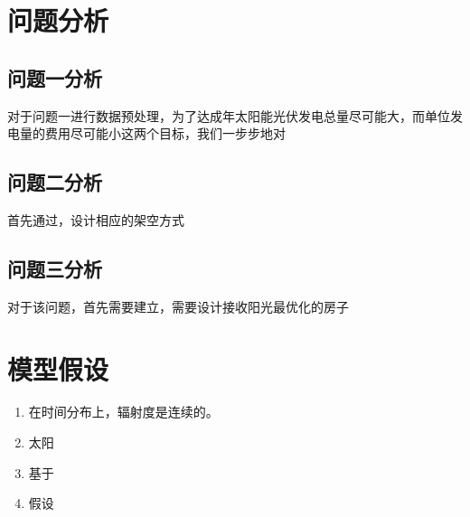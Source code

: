 \documentclass{ctexart}
\begin{document}
    \section{问题分析}
    \subsection{问题一分析}
    对于问题一进行数据预处理，为了达成年太阳能光伏发电总量尽可能大，而单位发电量的费用尽可能小这两个目标，我们一步步地对
    \subsection{问题二分析}
    首先通过，设计相应的架空方式
    \subsection{问题三分析}
    对于该问题，首先需要建立，需要设计接收阳光最优化的房子

    \section{模型假设}
    \begin{enumerate}[(1)]
        \item 在时间分布上，辐射度是连续的。
        \item 太阳
        \item 基于
        \item 假设
    \end{enumerate}
\end{document}
